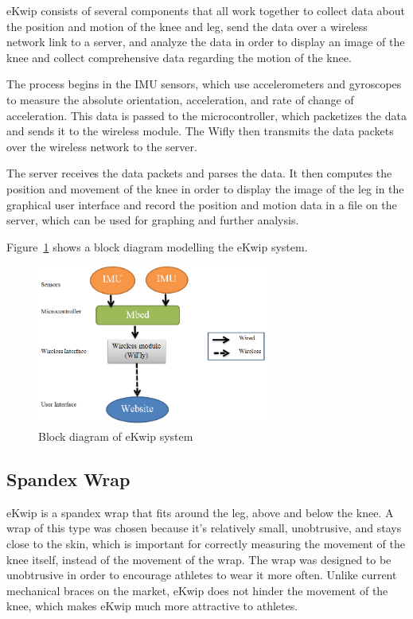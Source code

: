 eKwip consists of several components that all work together to collect data about the position and motion of the knee and leg, send the data over a wireless network link to a server, and analyze the data in order to display an image of the knee and collect comprehensive data regarding the motion of the knee.

The process begins in the IMU sensors, which use accelerometers and gyroscopes to measure the absolute orientation, acceleration, and rate of change of acceleration. This data is passed to the microcontroller, which packetizes the data and sends it to the wireless module. The Wifly then transmits the data packets over the wireless network to the server.

The server receives the data packets and parses the data. It then computes the position and movement of the knee in order to display the image of the leg in the graphical user interface and record the position and motion data in a file on the server, which can be used for graphing and further analysis.

Figure~\ref{fig:block_diagram} shows a block diagram modelling the eKwip system.

\begin{figure}[h]
  \begin{center}
    \includegraphics[width=3in]{images/block_diagram.PNG}
  \end{center}
  \caption{Block diagram of eKwip system}
  \label{fig:block_diagram}
\end{figure}

\subsection {Spandex Wrap}
eKwip is a spandex wrap that fits around the leg, above and below the knee. A wrap of this type was chosen because it's relatively small, unobtrusive, and stays close to the skin, which is important for correctly measuring the movement of the knee itself, instead of the movement of the wrap. The wrap was designed to be unobtrusive in order to encourage athletes to wear it more often. Unlike current mechanical braces on the market, eKwip does not hinder the movement of the knee, which makes eKwip much more attractive to athletes.

